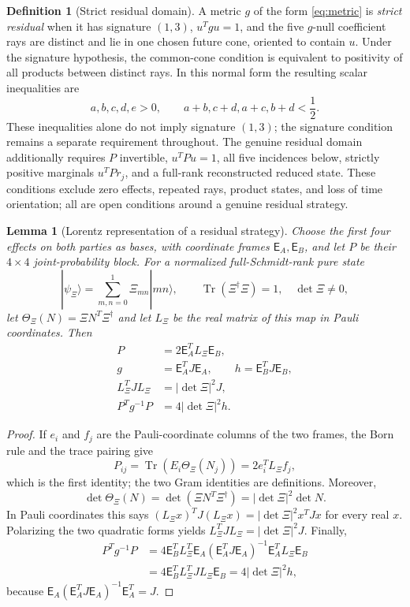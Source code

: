 \documentclass[11pt]{article}
\newtheorem{lemma}[theorem]{Lemma}
\theoremstyle{definition}
\newtheorem{definition}[theorem]{Definition}
\newcommand{\Tr}{\operatorname{Tr}}
\begin{document}
\begin{definition}[Strict residual domain]
\label{def:strict-residual}
A metric \(g\) of the form \eqref{eq:metric} is \emph{strict residual} when
it has signature \((1,3)\), \(u^Tgu=1\), and the five \(g\)-null coefficient
rays are distinct and lie in one chosen future cone, oriented to contain
\(u\). Under the signature hypothesis, the common-cone condition is
equivalent to positivity of all products between distinct rays. In this
normal form the resulting scalar inequalities are
\[
a,b,c,d,e>0,\qquad
a+b,c+d,a+c,b+d<\frac12.
\]
These inequalities alone do not imply signature \((1,3)\); the signature
condition remains a separate requirement throughout.
The genuine residual domain additionally requires \(P\) invertible,
\(u^TPu=1\), all five incidences below, strictly positive marginals
\(u^TPr_j\), and a full-rank reconstructed reduced state. These conditions
exclude zero effects, repeated rays, product states, and loss of time
orientation; all are open conditions around a genuine residual strategy.
\end{definition}

\begin{lemma}[Lorentz representation of a residual strategy]
\label{lem:lorentz-representation}
Choose the first four effects on both parties as bases, with coordinate
frames \(\mathsf E_A,\mathsf E_B\), and let \(P\) be their \(4\times4\)
joint-probability block. For a normalized full-Schmidt-rank pure state
\[
|\psi_\Xi\rangle=\sum_{m,n=0}^1\Xi_{mn}|mn\rangle,
\qquad \Tr(\Xi^\dagger\Xi)=1,\quad\det\Xi\ne0,
\]
let \(\Theta_\Xi(N)=\Xi N^T\Xi^\dagger\) and let \(L_\Xi\) be the real matrix
of this map in Pauli coordinates. Then
\[
\begin{aligned}
P&=2\mathsf E_A^TL_\Xi\mathsf E_B,\\
g&=\mathsf E_A^TJ\mathsf E_A,\qquad
h=\mathsf E_B^TJ\mathsf E_B,\\
L_\Xi^TJL_\Xi&=|\det\Xi|^2J,\\
P^Tg^{-1}P&=4|\det\Xi|^2h.
\end{aligned}
\]
\end{lemma}

\begin{proof}
If \(e_i\) and \(f_j\) are the Pauli-coordinate columns of the two frames,
the Born rule and the trace pairing give
\[
P_{ij}=\Tr\!\left(E_i\Theta_\Xi(N_j)\right)
=2e_i^TL_\Xi f_j,
\]
which is the first identity; the two Gram identities are definitions.
Moreover,
\[
\det\Theta_\Xi(N)
=\det(\Xi N^T\Xi^\dagger)
=|\det\Xi|^2\det N.
\]
In Pauli coordinates this says
\((L_\Xi x)^TJ(L_\Xi x)=|\det\Xi|^2x^TJx\) for every real \(x\).
Polarizing the two quadratic forms yields
\(L_\Xi^TJL_\Xi=|\det\Xi|^2J\). Finally,
\[
\begin{aligned}
P^Tg^{-1}P
&=4\mathsf E_B^TL_\Xi^T
\mathsf E_A(\mathsf E_A^TJ\mathsf E_A)^{-1}
\mathsf E_A^TL_\Xi\mathsf E_B\\
&=4\mathsf E_B^TL_\Xi^TJL_\Xi\mathsf E_B
=4|\det\Xi|^2h,
\end{aligned}
\]
because
\(\mathsf E_A(\mathsf E_A^TJ\mathsf E_A)^{-1}\mathsf E_A^T=J\).
\end{proof}
\end{document}
